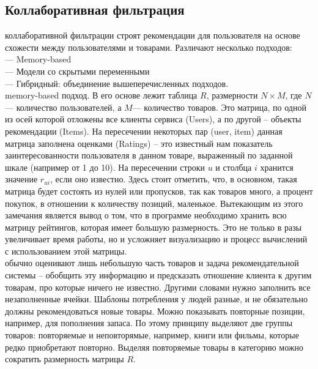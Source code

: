 \documentclass{article}
\newcommand\tab[1][1cm]{\hspace*{#1}}
\begin{document}
\subsection{Коллаборативная фильтрация}
 коллаборативной фильтрации строят рекомендации для пользователя на основе схожести между пользователями и товарами. Различают несколько подходов:\\
\tab— Memory-based\\
\tab— Модели со скрытыми переменными\\
\tab— Гибридный: объединение вышеперечисленных подходов.\\
 memory-based подход. В его основе лежит таблица $R$, ﻿размерности $N\times M$, где ﻿$N$﻿ — количество пользователей, а $M$— количество товаров. Это матрица, по одной из осей которой отложены все клиенты сервиса (Users), а по другой – объекты рекомендации (Items). На пересечении некоторых пар (user, item) данная матрица заполнена оценками (Ratings) – это известный нам показатель заинтересованности пользователя в данном товаре, выраженный по заданной шкале (например от 1 до 10). На пересечении строки $u$ и столбца ﻿$i$﻿ хранится значение ﻿$r_{ui}$﻿, если оно известно. Здесь стоит отметить, что, в основном, такая матрица будет состоять из нулей или пропусков, так как товаров много, а процент покупок, в отношении к количеству позиций, маленькое. Вытекающим из этого замечания является вывод о том, что в программе необходимо хранить всю матрицу рейтингов, которая имеет большую размерность. Это не только в разы увеличивает время работы, но и усложняет визуализацию и процесс вычислений с использованием этой матрицы. \\
 обычно оценивают лишь небольшую часть товаров и задача рекомендательной системы – обобщить эту информацию и предсказать отношение клиента к другим товарам, про которые ничего не известно. Другими словами нужно заполнить все незаполненные ячейки. Шаблоны потребления у людей разные, и не обязательно должны рекомендоваться новые товары. Можно показывать повторные позиции, например, для пополнения запаса. По этому принципу выделяют две группы товаров: повторяемые и неповторямые, например, книги или фильмы, которые редко приобретают повторно. Выделяя повторяемые товары в категорию можно сократить размерность матрицы $R$.
\end{document}
